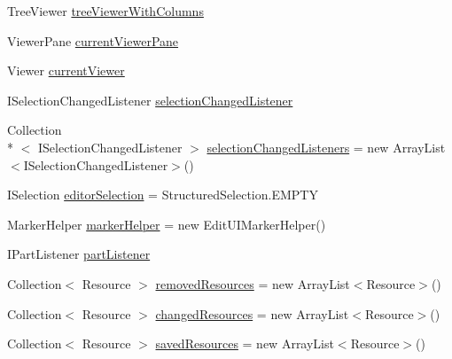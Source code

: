 \begin{DoxyCompactItemize}
\item 
Tree\-Viewer \hyperlink{classshootingmachineemfmodel_1_1presentation_1_1_shootingmachineemfmodel_editor_aeccb5b2ffe5e81b881fcf3a2d8b71407}{tree\-Viewer\-With\-Columns}
\item 
Viewer\-Pane \hyperlink{classshootingmachineemfmodel_1_1presentation_1_1_shootingmachineemfmodel_editor_a89ab81f45d570dff37c5ca43a3b2b208}{current\-Viewer\-Pane}
\item 
Viewer \hyperlink{classshootingmachineemfmodel_1_1presentation_1_1_shootingmachineemfmodel_editor_a38114af71dfd97a0defcebc62aef236f}{current\-Viewer}
\item 
I\-Selection\-Changed\-Listener \hyperlink{classshootingmachineemfmodel_1_1presentation_1_1_shootingmachineemfmodel_editor_a68d9ace346daee5f9e536efe481f27b2}{selection\-Changed\-Listener}
\item 
Collection\\*
$<$ I\-Selection\-Changed\-Listener $>$ \hyperlink{classshootingmachineemfmodel_1_1presentation_1_1_shootingmachineemfmodel_editor_a602d525f2c28d51f817df019baad462c}{selection\-Changed\-Listeners} = new Array\-List$<$I\-Selection\-Changed\-Listener$>$()
\item 
I\-Selection \hyperlink{classshootingmachineemfmodel_1_1presentation_1_1_shootingmachineemfmodel_editor_aec839fd79b2747a2d021c15cbafbdd08}{editor\-Selection} = Structured\-Selection.\-E\-M\-P\-T\-Y
\item 
Marker\-Helper \hyperlink{classshootingmachineemfmodel_1_1presentation_1_1_shootingmachineemfmodel_editor_a8fca1a50d4e1743045a3d72583e7e059}{marker\-Helper} = new Edit\-U\-I\-Marker\-Helper()
\item 
I\-Part\-Listener \hyperlink{classshootingmachineemfmodel_1_1presentation_1_1_shootingmachineemfmodel_editor_a30c956da01f649d6d98c017db4b1672b}{part\-Listener}
\item 
Collection$<$ Resource $>$ \hyperlink{classshootingmachineemfmodel_1_1presentation_1_1_shootingmachineemfmodel_editor_abbd471685319f6b671fc241681618bdc}{removed\-Resources} = new Array\-List$<$Resource$>$()
\item 
Collection$<$ Resource $>$ \hyperlink{classshootingmachineemfmodel_1_1presentation_1_1_shootingmachineemfmodel_editor_adde575ef463fcb70a4c8c0d5db9ba280}{changed\-Resources} = new Array\-List$<$Resource$>$()
\item 
Collection$<$ Resource $>$ \hyperlink{classshootingmachineemfmodel_1_1presentation_1_1_shootingmachineemfmodel_editor_a80a06dd2f7dbaed42044fadca8dc3eb1}{saved\-Resources} = new Array\-List$<$Resource$>$()

\end{DoxyCompactItemize}
